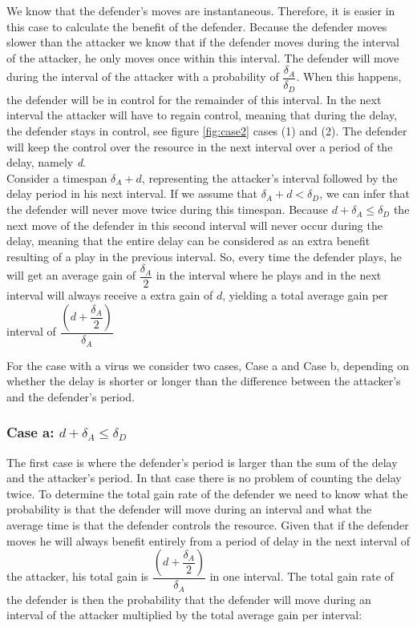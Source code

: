 We know that the defender's moves are instantaneous. Therefore, it is easier in this case to calculate the benefit of the defender. Because the defender moves slower than the attacker we know that if the defender moves during the interval of the attacker, he only moves once within this interval.
The defender will move during the interval of the attacker with a probability of $\dfrac{\delta_{A}}{\delta_{D}} $. When this happens, the defender will be in control for the remainder of this interval. In the next interval the attacker will have to regain control, meaning that during the delay, the defender stays in control, see figure \ref{fig:case2} cases (1) and  (2). The defender will keep the control over the resource in the next interval over a period of the delay, namely \textit{d}. \\

Consider a timespan $\delta_{A} + d$, representing the attacker's interval followed by the delay period in his next interval. If we assume that $\delta_{A}+d<\delta_{D}$, we can infer that the defender will never move twice during this timespan.
Because $d + \delta_{A} \leq \delta_{D}$ the next move of the defender in this second interval will never occur during the delay, meaning that the entire delay can be considered as an extra benefit resulting of a play in the previous interval. 
So, every time the defender plays, he will get an average gain of $\dfrac{\delta_{A}}{2}$ in the interval where he plays and in the next interval will always receive a extra gain of $d$, yielding a total average gain per interval of
$\dfrac{(d+\dfrac{\delta_{A}}{2})}{\delta_{A}}$ 

For the case with a virus we consider two cases, Case a and Case b, depending on whether the delay is shorter or longer than the difference between the attacker's and the defender's period.  \\


\subsubsection*{\textbf{Case a:} $d + \delta_{A} \leq \delta_{D}$}
The first case is where the defender's period is larger than the sum of the delay and the attacker's period. In that case there is no problem of counting the delay twice. To determine the total gain rate of the defender we need to know what the probability is that the defender will move during an interval and what the average time is that the defender controls the resource. Given that if the defender moves he will always benefit entirely from a period of delay in the next interval of the attacker, his total gain is $\dfrac{(d+\dfrac{\delta_{A}}{2})}{\delta_{A}}$ in one interval.
The total gain  rate of the defender is then the probability that the defender will move during an interval of the attacker multiplied by the total average gain per interval: 

